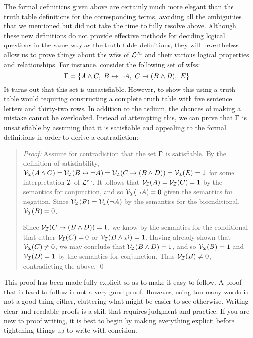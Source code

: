 The formal definitions given above are certainly much more elegant than the truth table definitions for the corresponding terms, avoiding all the ambiguities that we mentioned but did not take the time to fully resolve above.
Although these new definitions do not provide effective methods for deciding logical questions in the same way as the truth table definitions, they will nevertheless allow us to prove things about the wfss of $\mathcal{L}^{\textsc{pl}}$ and their various logical properties and relationships.
For instance, consider the following set of wfss:
$$ \Gamma = \lbrace A \wedge  C,\ B \leftrightarrow \neg A,\ C \rightarrow (B \wedge D),\ E\rbrace $$
It turns out that this set is unsatisfiable.
However, to show this using a truth table would requiring constructing a complete truth table with five sentence letters and thirty-two rows.
In addition to the tedium, the chances of making a mistake cannot be overlooked.
Instead of attempting this, we can prove that $\Gamma$ is unsatisfiable by assuming that it is satisfiable and appealing to the formal definitions in order to derive a contradiction: 

\begin{quote} 
  \textit{Proof:} Assume for contradiction that the set $\Gamma$ is satisfiable.
  By the definition of satisfiability, $\mathcal{V}_{\mathcal{I}}(A \wedge  C) = \mathcal{V}_{\mathcal{I}}(B \leftrightarrow \neg A) = \mathcal{V}_{\mathcal{I}}(C \rightarrow (B \wedge D)) = \mathcal{V}_{\mathcal{I}}(E) = 1$ for some interpretation $\mathcal{I}$ of $\mathcal{L}^{\textsc{pl}}$. 
  It follows that $\mathcal{V}_{\mathcal{I}}(A) = \mathcal{V}_{\mathcal{I}}(C) = 1$ by the semantics for conjunction, and so $\mathcal{V}_{\mathcal{I}}(\neg A) = 0$ given the semantics for negation. 
  Since $\mathcal{V}_{\mathcal{I}}(B) = \mathcal{V}_{\mathcal{I}}(\neg A)$ by the semantics for the biconditional, $\mathcal{V}_{\mathcal{I}}(B) = 0$. 

  Since $\mathcal{V}_{\mathcal{I}}(C \rightarrow (B \wedge D)) = 1$, we know by the semantics for the conditional that either $\mathcal{V}_{\mathcal{I}}(C) = 0$ or $\mathcal{V}_{\mathcal{I}}(B \wedge D) = 1$.
  Having already shown that $\mathcal{V}_{\mathcal{I}}(C) \neq 0$, we may conclude that $\mathcal{V}_{\mathcal{I}}(B \wedge D) = 1$, and so $\mathcal{V}_{\mathcal{I}}(B) = 1$ and $\mathcal{V}_{\mathcal{I}}(D) = 1$ by the semantics for conjunction.
  Thus $\mathcal{V}_{\mathcal{I}}(B) \neq 0$, contradicting the above.
  \qed
\end{quote}

This proof has been made fully explicit so as to make it easy to follow.
A proof that is hard to follow is not a very good proof.
However, using too many words is not a good thing either, cluttering what might be easier to see otherwise.
Writing clear and readable proofs is a skill that requires judgment and practice.
If you are new to proof writing, it is best to begin by making everything explicit before tightening things up to write with concision.

